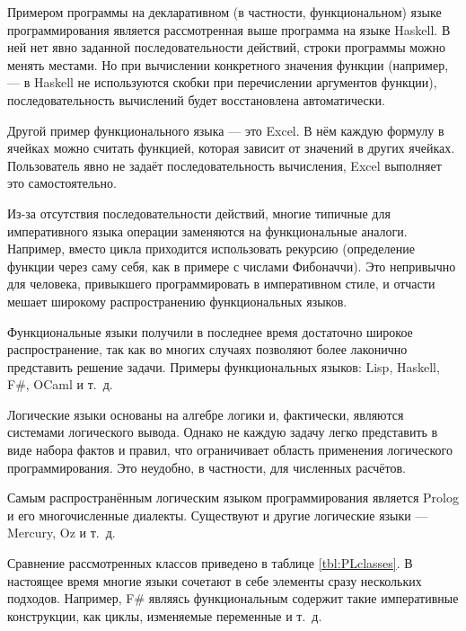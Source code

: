 Примером программы на декларативном (в частности, функциональном)
языке программирования является рассмотренная выше программа на языке
Haskell. В ней нет явно заданной последовательности действий, строки
программы можно менять местами. Но при вычислении конкретного значения
функции (например,  — в Haskell не используются скобки при
перечислении аргументов функции), последовательность вычислений будет
восстановлена автоматически.

Другой пример функционального языка — это Excel. В нём каждую формулу
в ячейках можно считать функцией, которая зависит от значений в других
ячейках. Пользователь явно не задаёт последовательность вычисления,
Excel выполняет это самостоятельно.

Из-за отсутствия последовательности действий, многие типичные для
императивного языка операции заменяются на функциональные аналоги.
Например, вместо цикла приходится использовать рекурсию (определение
функции через саму себя, как в примере с числами Фибоначчи). Это
непривычно для человека, привыкшего программировать в императивном
стиле, и отчасти мешает широкому распространению функциональных
языков.

Функциональные языки получили в последнее время достаточно широкое
распространение, так как во многих случаях позволяют более лаконично
представить решение задачи. Примеры функциональных языков: Lisp,
Haskell, F\#, OCaml и т.~д.

Логические языки основаны на алгебре логики и, фактически, являются
системами логического вывода. Однако не каждую задачу легко
представить в виде набора фактов и правил, что ограничивает область
применения логического программирования. Это неудобно, в частности,
для численных расчётов.

Самым распространённым логическим языком программирования является
Prolog и его многочисленные диалекты. Существуют и другие логические
языки — Mercury, Oz и т.~д.

Сравнение рассмотренных классов приведено в таблице
\ref{tbl:PLclasses}.  В настоящее время многие языки сочетают в себе
элементы сразу нескольких подходов. Например, F\# являясь
функциональным содержит такие императивные конструкции, как циклы,
изменяемые переменные и т.~д.

